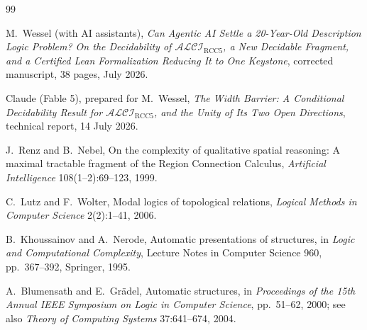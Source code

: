 \documentclass[11pt]{article}
\theoremstyle{definition}
\theoremstyle{remark}
\begin{document}
\begin{thebibliography}{99}

M.~Wessel (with AI assistants),
\newblock \emph{Can Agentic AI Settle a 20-Year-Old Description Logic Problem? On the Decidability of $\mathcal{ALCI}_{\mathrm{RCC5}}$, a New Decidable Fragment, and a Certified Lean Formalization Reducing It to One Keystone},
\newblock corrected manuscript, 38 pages, July 2026.

Claude (Fable 5), prepared for M.~Wessel,
\newblock \emph{The Width Barrier: A Conditional Decidability Result for $\mathcal{ALCI}_{\mathrm{RCC5}}$, and the Unity of Its Two Open Directions},
\newblock technical report, 14 July 2026.

J.~Renz and B.~Nebel,
\newblock On the complexity of qualitative spatial reasoning: A maximal tractable fragment of the Region Connection Calculus,
\newblock \emph{Artificial Intelligence} 108(1--2):69--123, 1999.

C.~Lutz and F.~Wolter,
\newblock Modal logics of topological relations,
\newblock \emph{Logical Methods in Computer Science} 2(2):1--41, 2006.

B.~Khoussainov and A.~Nerode,
\newblock Automatic presentations of structures,
\newblock in \emph{Logic and Computational Complexity}, Lecture Notes in Computer Science 960, pp.~367--392, Springer, 1995.

A.~Blumensath and E.~Gr\"adel,
\newblock Automatic structures,
\newblock in \emph{Proceedings of the 15th Annual IEEE Symposium on Logic in Computer Science}, pp.~51--62, 2000; see also \emph{Theory of Computing Systems} 37:641--674, 2004.

\end{thebibliography}
\end{document}
